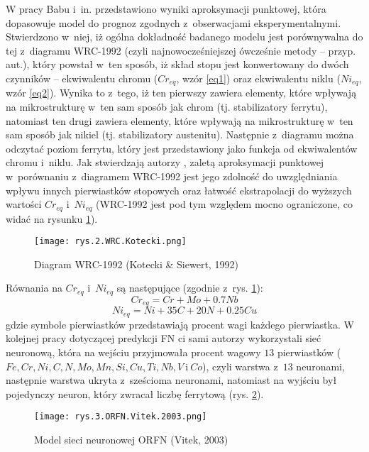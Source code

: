 W pracy Babu i~in. \cite{Babu13} przedstawiono wyniki aproksymacji punktowej, która dopasowuje model do prognoz zgodnych z~obserwacjami eksperymentalnymi. Stwierdzono w~niej, iż ogólna dokładność badanego modelu jest porównywalna do tej z~diagramu WRC-1992 (czyli najnowocześniejszej ówcześnie metody – przyp. aut.), który powstał w~ten sposób, iż skład stopu jest konwertowany do dwóch czynników – ekwiwalentu chromu ($Cr_{eq}$, wzór \ref{eq1}) oraz ekwiwalentu niklu ($Ni_{eq}$, wzór \ref{eq2}). Wynika to z~tego, iż ten pierwszy zawiera elementy, które wpływają na mikrostrukturę w~ten sam sposób jak chrom (tj. stabilizatory ferrytu), natomiast ten drugi zawiera elementy, które wpływają na mikrostrukturę w~ten sam sposób jak nikiel (tj. stabilizatory austenitu). Następnie z~diagramu można odczytać poziom ferrytu, który jest przedstawiony jako funkcja od ekwiwalentów chromu i~niklu. Jak stwierdzają autorzy \cite{Babu13}, zaletą aproksymacji punktowej w~porównaniu z~diagramem WRC-1992 jest jego zdolność do uwzględniania wpływu innych pierwiastków stopowych oraz łatwość ekstrapolacji do wyższych wartości $Cr_{eq}$ i~$Ni_{eq}$ (WRC-1992 jest pod tym względem mocno ograniczone, co widać na rysunku \ref{fig:mesh2}).
\begin{figure}[h]
    \centering
    \texttt{[image: rys.2.WRC.Kotecki.png]}
    \caption{Diagram WRC-1992 (Kotecki \& Siewert, 1992)}
    \label{fig:mesh2}
\end{figure}

\noindent Równania na  $Cr_{eq}$ i~$Ni_{eq}$ są następujące (zgodnie z~rys. \ref{fig:mesh2}):
\begin{equation}
\label{eq1}
	Cr_{eq} = Cr + Mo + 0.7Nb
\end{equation}
\begin{equation}
\label{eq2}
	Ni_{eq} = Ni+35C+20N+0.25Cu
\end{equation}
gdzie symbole pierwiastków przedstawiają procent wagi każdego pierwiastka.
W kolejnej pracy \cite{Vitek03.I} dotyczącej predykcji FN ci sami autorzy wykorzystali sieć neuronową, która na wejściu przyjmowała procent wagowy $13$ pierwiastków ($Fe, Cr, Ni, C, N, Mo, Mn, Si, Cu, Ti, Nb, V~$i$~Co$), czyli warstwa z~$13$ neuronami, następnie warstwa ukryta z~sześcioma neuronami, natomiast na wyjściu był pojedynczy neuron, który zwracał liczbę ferrytową (rys. \ref{fig:mesh3}).

\begin{figure}[h]
    \centering
    \texttt{[image: rys.3.ORFN.Vitek.2003.png]}
    \caption{Model sieci neuronowej ORFN (Vitek, 2003)}
    \label{fig:mesh3}
\end{figure}

